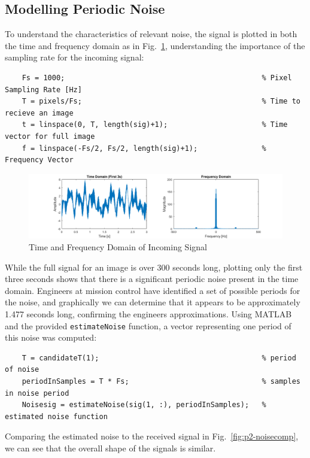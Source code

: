 \documentclass[12pt]{article}
\begin{document}
\subsection{Modelling Periodic Noise}

To understand the characteristics of relevant noise, the signal is plotted in
both the time and frequency domain as in Fig.~\ref{fig:p2-timefreq},
understanding the importance of the sampling rate for the incoming signal:
\begin{verbatim}
    Fs = 1000;                                              % Pixel Sampling Rate [Hz]
    T = pixels/Fs;                                          % Time to recieve an image
    t = linspace(0, T, length(sig)+1);                      % Time vector for full image
    f = linspace(-Fs/2, Fs/2, length(sig)+1);               % Frequency Vector
\end{verbatim}

\begin{figure}[h]
    \centering
    \includegraphics{figures/p2-timefreq.png}
    \caption{Time and Frequency Domain of Incoming Signal\label{fig:p2-timefreq}}
\end{figure}

While the full signal for an image is over 300 seconds long, plotting only the
first three seconds shows that there is a significant periodic noise present in
the time domain. Engineers at mission control have identified a set of possible
periods for the noise, and graphically we can determine that it appears to be
approximately 1.477 seconds long, confirming the engineers approximations.
Using MATLAB and the provided \verb+estimateNoise+ function, a vector
representing one period of this noise was computed:
\begin{verbatim}
    T = candidateT(1);                                      % period of noise
    periodInSamples = T * Fs;                               % samples in noise period
    Noisesig = estimateNoise(sig(1, :), periodInSamples);   % estimated noise function
\end{verbatim}

Comparing the estimated noise to the received signal in
Fig.~\ref{fig:p2-noisecomp}, we can see that the overall shape of the signals
is similar.
\end{document}
